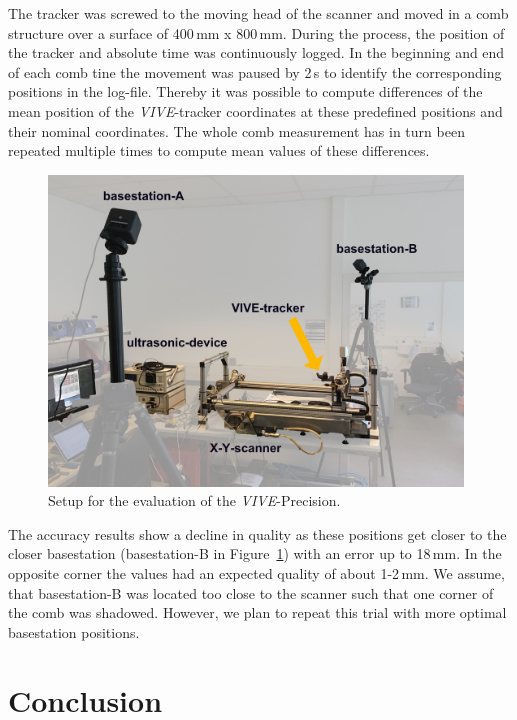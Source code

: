 \documentclass{VRARWorkshop}
\begin{document}
The tracker was screwed to the moving head of the scanner and moved in a comb structure over a surface of 400\,mm x 800\,mm.
During the process, the position of the tracker and absolute time was continuously logged.
In the beginning and end of each comb tine the movement was paused by 2\,s to identify the corresponding positions in the log-file.
Thereby it was possible to compute differences of the mean position of the \textit{VIVE}-tracker coordinates at these predefined positions and their nominal coordinates.
The whole comb measurement has in turn been repeated multiple times to compute mean values of these differences.
\begin{figure}[h!]
    \begin{center}
        \includegraphics[width=110mm]{images/PrecisionMeasurement}
        \caption{\label{fig:precisionMeasurementSetup} Setup for the evaluation of the \textit{VIVE}-Precision.}
    \end{center}
\end{figure}
The accuracy results show a decline in quality as these positions get closer to the closer basestation (basestation-B in Figure~\ref{fig:precisionMeasurementSetup}) with an error up to 18\,mm.
In the opposite corner the values had an expected quality of about 1-2\,mm.
We assume, that basestation-B was located too close to the scanner such that one corner of the comb was shadowed.
However, we plan to repeat this trial with more optimal basestation positions.


\section{Conclusion}
\end{document}
